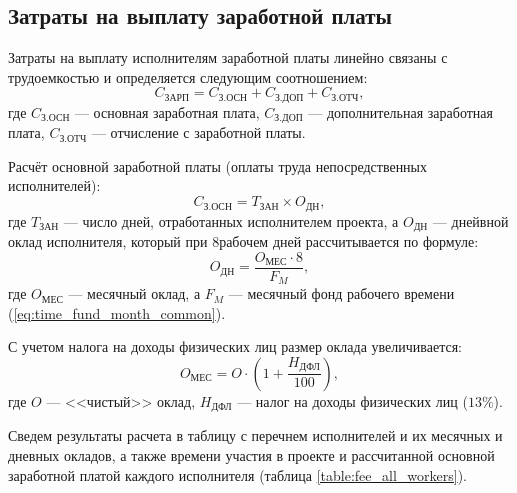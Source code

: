 \subsection{Затраты на выплату заработной платы} \label{salary}

Затраты на выплату исполнителям заработной платы линейно связаны с трудоемкостью и определяется следующим соотношением:
\begin{equation}
  \label{eq:salary}
C_\textrm{ЗАРП} = C_\textrm{З.ОСН} + C_\textrm{З.ДОП} + C_\textrm{З.ОТЧ},
\end{equation}
где $C_\textrm{З.ОСН}$ --- основная заработная плата, $C_\textrm{З.ДОП}$ --- дополнительная заработная плата, $C_\textrm{З.ОТЧ}$ --- отчисление с заработной платы.

\vspace{\baselineskip}
Расчёт основной заработной платы (оплаты труда непосредственных исполнителей):
\begin{equation}
  \label{eq:salary_counting}
C_\textrm{З.ОСН} = T_\textrm{ЗАН} \times O_\textrm{ДН},
\end{equation}
где $T_\textrm{ЗАН}$ --- число дней, отработанных исполнителем проекта, а $O_\textrm{ДН}$ --- днейвной оклад исполнителя, который при 8 рабочем дней рассчитывается по формуле:
\begin{equation}
  \label{eq:worker_fee}
O_\textrm{ДН} = \frac {O_\textrm{МЕС} \cdot 8} {F_M},
\end{equation}
где $O_\textrm{МЕС}$ --- месячный оклад, а $F_M$ --- месячный фонд рабочего времени (\ref{eq:time_fund_month_common}).

\vspace{\baselineskip}
С учетом налога на доходы физических лиц размер оклада увеличивается:
\begin{equation}
  \label{eq:worker_fee_with_taxes}
O_\textrm{МЕС} = O \cdot (1 + \frac {H_\textrm{ДФЛ}} {100}),
\end{equation}
где $O$ --- <<чистый>> оклад, $H_\textrm{ДФЛ}$ --- налог на доходы физических лиц ($13\%$).

\vspace{\baselineskip}
Сведем результаты расчета в таблицу с перечнем исполнителей и их месячных и дневных окладов, а также времени участия в проекте и рассчитанной основной заработной платой каждого исполнителя (таблица \ref{table:fee_all_workers}).


